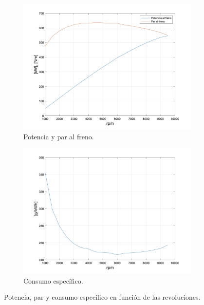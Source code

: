 \begin{figure}[H]
	\centering
	\begin{subfigure}[b]{0.45\textwidth}
   		 \centering
		 \includegraphics[width=\linewidth]{Figures/01/Potencia_rpm.jpg}
		 \caption{Potencia y par al freno.}
	\end{subfigure}
	\hfill
	\begin{subfigure}[b]{0.45\textwidth}
   		 \centering
		 \includegraphics[width=\linewidth]{Figures/01/BSFC_rpm.jpg}
		 \caption{Consumo específico.}
	\end{subfigure}
	
	\caption{Potencia, par y consumo específico en función de las revoluciones.}
	\label{fig:RPM_power}
\end{figure}

